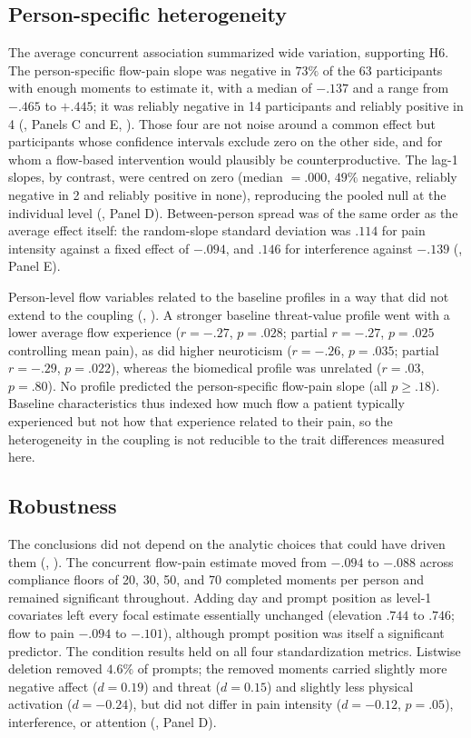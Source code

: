 \documentclass[11pt,a4paper]{article}
\begin{document}
\subsection{Person-specific heterogeneity}
The average concurrent association summarized wide variation, supporting H6. The person-specific
flow-pain slope was negative in $73\%$ of the 63 participants with enough moments to estimate it,
with a median of $-.137$ and a range from $-.465$ to $+.445$; it was reliably negative in 14
participants and reliably positive in 4 (, Panels C and E, ).
Those four are not noise around a common effect but participants whose confidence intervals exclude
zero on the other side, and for whom a flow-based intervention would plausibly be
counterproductive. The lag-1 slopes, by contrast, were centred on zero (median $=.000$, $49\%$
negative, reliably negative in 2 and reliably positive in none), reproducing the pooled null at the
individual level (, Panel D). Between-person spread was of the same order as the
average effect itself: the random-slope standard deviation was $.114$ for pain intensity against a
fixed effect of $-.094$, and $.146$ for interference against $-.139$ (, Panel E).

Person-level flow variables related to the baseline profiles in a way that did not extend to the
coupling (, ). A stronger baseline threat-value
profile went with a lower average flow experience ($r=-.27$, $p=.028$; partial $r=-.27$,
$p=.025$ controlling mean pain), as did higher neuroticism ($r=-.26$, $p=.035$; partial $r=-.29$,
$p=.022$), whereas the biomedical profile was unrelated ($r=.03$, $p=.80$). No profile predicted the
person-specific flow-pain slope (all $p \geq .18$). Baseline characteristics thus indexed how much
flow a patient typically experienced but not how that experience related to their pain, so the
heterogeneity in the coupling is not reducible to the trait differences measured here.

\subsection{Robustness}
The conclusions did not depend on the analytic choices that could have driven them
(, ). The concurrent flow-pain estimate moved from
$-.094$ to $-.088$ across compliance floors of 20, 30, 50, and 70 completed moments per person and
remained significant throughout. Adding day and prompt position as level-1 covariates left every
focal estimate essentially unchanged (elevation $.744$ to $.746$; flow to pain $-.094$ to $-.101$),
although prompt position was itself a significant predictor. The condition results held on all four
standardization metrics. Listwise deletion removed $4.6\%$ of prompts; the removed moments carried
slightly more negative affect ($d=0.19$) and threat ($d=0.15$) and slightly less physical
activation ($d=-0.24$), but did not differ in pain intensity ($d=-0.12$, $p=.05$),
interference, or attention (, Panel D).
\end{document}
